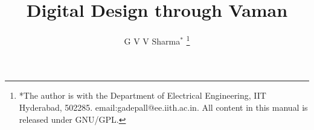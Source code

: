 \documentclass[journal,12pt,twocolumn]{IEEEtran}
\renewcommand\thesection{\arabic{section}}
\begin{document}
\let\StandardTheFigure\thefigure
\let\vec\mathbf
\renewcommand{\thefigure}{\thesection}



\def\putbox#1#2#3{\makebox[0in][l]{\makebox[#1][l]{}\raisebox{\baselineskip}[0in][0in]{\raisebox{#2}[0in][0in]{#3}}}}
     \def\rightbox#1{\makebox[0in][r]{#1}}
     \def\centbox#1{\makebox[0in]{#1}}
     \def\topbox#1{\raisebox{-\baselineskip}[0in][0in]{#1}}
     \def\midbox#1{\raisebox{-0.5\baselineskip}[0in][0in]{#1}}

\vspace{3cm}

\title{
Digital Design through Vaman
}
\author{ 
G V V Sharma$^{*}$%
	\thanks{*The author is with the Department of Electrical Engineering, IIT Hyderabad, 502285. email:gadepall@ee.iith.ac.in. All content in this manual is released under GNU/GPL.}
	
}	

	


%
%
%
\end{document}
